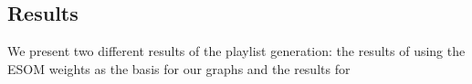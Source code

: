 \subsection{Results}

We present two different results of the playlist generation: the results of using the ESOM weights as the basis for our graphs and the results for 





